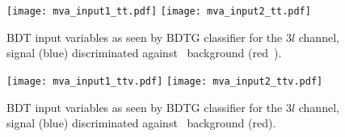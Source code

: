 \begin{figure} [!h]
  \centering
  \texttt{[image: mva\_input1\_tt.pdf]}
  \texttt{[image: mva\_input2\_tt.pdf]}
  \caption[BDT input variables. Discrimination against \ttbar in $3l$ channel.]{BDT input variables as seen by BDTG classifier for the $3l$ channel, \tHq signal (blue) discriminated against \ttbar\ background (red\
    ).}
  \label{mva_input_tt}
\end{figure}

\begin{figure} [!h]
  \centering
  \texttt{[image: mva\_input1\_ttv.pdf]}
  \texttt{[image: mva\_input2\_ttv.pdf]}
  \caption[BDT input variables. Discrimination against \ttV\ in $3l$ channel.]{BDT input variables as seen by BDTG classifier for the $3l$ channel, \tHq signal (blue) discriminated against \ttV\ background (red).}
\label{mva_input_ttv}
\end{figure}

\vspace{15cm}

\newpage

